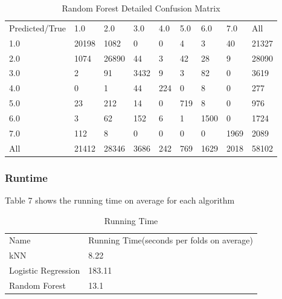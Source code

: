 \documentclass[12pt]{report}
\begin{document}
\begin{table}
\centering
\caption{Random Forest Detailed Confusion Matrix}
\label{my-label}
\begin{tabular}{lllllllll}
Predicted/True    &1.0    &2.0   &3.0 & 4.0  &5.0  & 6.0 &  7.0 &   All\\
1.0        &20198   &1082    & 0 &   0   & 4  &   3   & 40 & 21327\\
2.0         &1074  &26890  &  44   & 3 &  42  &  28   &  9  &28090\\
3.0         &   2 &    91 & 3432  &  9   & 3  &  82   &  0   &3619\\
4.0          &  0    &  1  &  44 & 224   & 0   &  8    & 0  &  277\\
5.0        &   23   & 212  &  14 &   0 & 719    & 8    & 0   & 976\\
6.0          &  3 &    62   &152  &  6   & 1 & 1500 &    0  & 1724\\
7.0        &  112  &    8  &   0   & 0  &  0   &  0 & 1969   &2089\\
All       & 21412 & 28346 & 3686  &242  &769 & 1629 & 2018 & 58102
\end{tabular}
\end{table}

\newpage
\subsubsection*{Runtime}
Table 7 shows the running time on average for each algorithm
\newline
\begin{table}
\centering
\caption{Running Time}
\label{my-label}
\begin{tabular}{ll}
 Name&  Running Time(seconds per folds on average) \\
 kNN&  8.22\\
 Logistic Regression& 183.11\\
 Random Forest& 13.1

\end{tabular}
\end{table}
\end{document}
